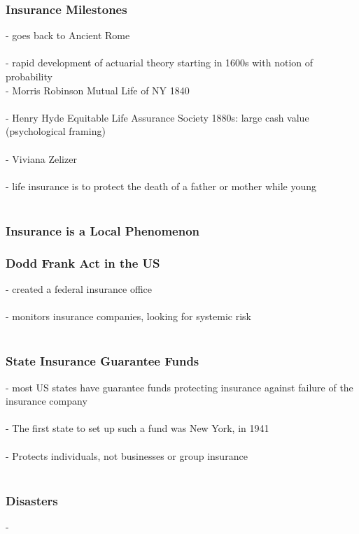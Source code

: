 \documentclass{article} %
\begin{document}
		\subsubsection*{Insurance Milestones}
		- goes back to Ancient Rome \\
		\\
		- rapid development of actuarial theory starting in 1600s with notion of probability 
		\\
		- Morris Robinson Mutual Life of NY 1840 \\
		\\
		- Henry Hyde Equitable Life Assurance Society 1880s: large cash value (psychological framing) \\
		\\
		- Viviana Zelizer \\
		\\
		- life insurance is to protect the death of a father or mother while young \\
		\\
		\subsubsection*{Insurance is a Local Phenomenon}
		
		\subsubsection*{Dodd Frank Act in the US}
		- created a federal insurance office \\
		\\
		- monitors insurance companies, looking for systemic risk \\
		\\
		\subsubsection*{State Insurance Guarantee Funds}
		- most US states have guarantee funds protecting insurance against failure of the insurance company \\
		\\
		- The first state to set up such a fund was New York, in 1941 \\
		\\
		- Protects individuals, not businesses or group insurance \\
		\\
		\subsubsection*{Disasters}
		- 
		
\end{document}
